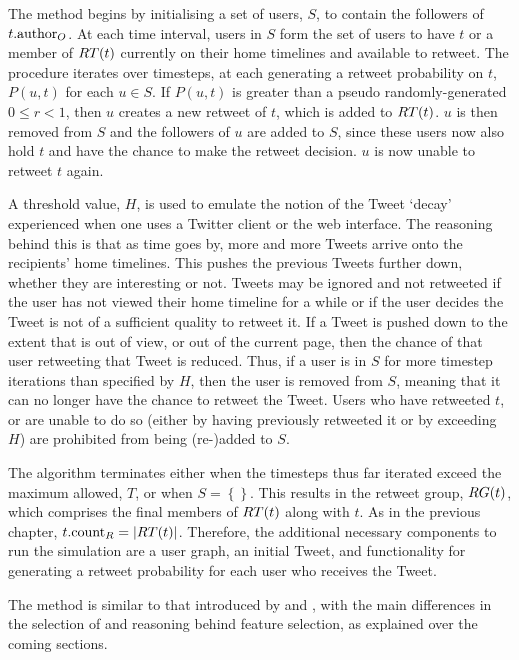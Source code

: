 The method begins by initialising a set of users, $S$, to contain the followers of $t.\textrm{author}_O$. At each time interval, users in $S$ form the set of users to have $t$ or a member of $RT(t)$ currently on their home timelines and available to retweet. The procedure iterates over timesteps, at each generating a retweet probability on $t$, $P(u,t)$ for each $u \in S$. If $P(u,t)$ is greater than a pseudo randomly-generated $0 \leq r < 1$, then $u$ creates a new retweet of $t$, which is added to $RT(t)$. $u$ is then removed from $S$ and the followers of $u$ are added to $S$, since these users now also hold $t$ and have the chance to make the retweet decision. $u$ is now unable to retweet $t$ again.

A threshold value, $H$, is used to emulate the notion of the Tweet `decay' experienced when one uses a Twitter client or the web interface. The reasoning behind this is that as time goes by, more and more Tweets arrive onto the recipients' home timelines. This pushes the previous Tweets further down, whether they are interesting or not. Tweets may be ignored and not retweeted if the user has not viewed their home timeline for a while or if the user decides the Tweet is not of a sufficient quality to retweet it. If a Tweet is pushed down to the extent that is out of view, or out of the current page, then the chance of that user retweeting that Tweet is reduced. Thus, if a user is in $S$ for more timestep iterations than specified by $H$, then the user is removed from $S$, meaning that it can no longer have the chance to retweet the Tweet. Users who have retweeted $t$, or are unable to do so (either by having previously retweeted it or by exceeding $H$) are prohibited from being (re-)added to $S$.

The algorithm terminates either when the timesteps thus far iterated exceed the maximum allowed, $T$, or when $S = \left\{\right\}$. This results in the retweet group, $RG(t)$, which comprises the final members of $RT(t)$ along with $t$. As in the previous chapter, $t.\textrm{count}_R = |RT(t)|$. Therefore, the additional necessary components to run the simulation are a user graph, an initial Tweet, and functionality for generating a retweet probability for each user who receives the Tweet.

The method is similar to that introduced by \citet{zhu11} and \citet{peng11}, with the main differences in the selection of and reasoning behind feature selection, as explained over the coming sections.

